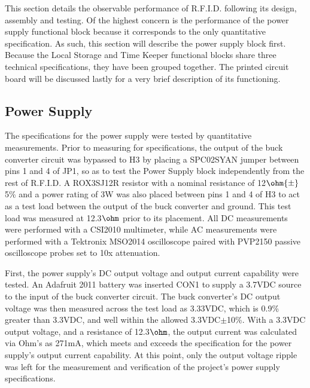     This section details the observable performance of R.F.I.D. following its design, assembly and testing.
    Of the highest concern is the performance of the power supply functional block \DIFdelbegin \DIFdel{, }\DIFdelend because it corresponds to the only quantitative specification. As such, this section will describe the power supply block first.
    Because the Local Storage and Time Keeper functional blocks share three technical specifications, they have been grouped together.
    The printed circuit board will be discussed lastly for a very brief description of its functioning.

\subsection{Power Supply}
The specifications for the power supply were tested by quantitative measurements.  Prior to measuring for specifications, the output of the buck converter circuit was bypassed to H3 by placing a SPC02SYAN jumper between pins 1 and 4 of JP1, so as to test the Power Supply block independently from the rest of R.F.I.D. A ROX3SJ12R resistor with a nominal resistance of 12$\ohm{\pm}$5\% and a power rating of 3W was also placed between pins 1 and 4 of H3 to act as a test load between the output of the buck converter and ground. This test load was measured at 12.3$\ohm$ prior to its placement. All DC measurements were performed with a CSI2010 multimeter, while AC measurements were performed with a Tektronix MSO2014 oscilloscope paired with PVP2150 passive oscilloscope probes set to 10x attenuation.

First, the power supply's DC output voltage and output current capability were tested. An Adafruit 2011 battery was inserted \DIFdelbegin {}\DIFdelend \DIFaddbegin {}\DIFaddend CON1 to supply a 3.7VDC source to the input of the buck converter circuit. The buck converter's DC output voltage was then measured across the test load as 3.33VDC, which is 0.9\% greater than 3.3VDC, and well within the allowed 3.3VDC$\pm$10\%. With a 3.3VDC output voltage, and a resistance of 12.3$\ohm$, the output current was calculated via Ohm's \DIFdelbegin {}\DIFdelend \DIFaddbegin {}\DIFaddend as 271mA, which meets and exceeds the specification for the power supply's output current capability. At this point, only the output voltage ripple was left for the measurement and verification of the project's power supply specifications.


